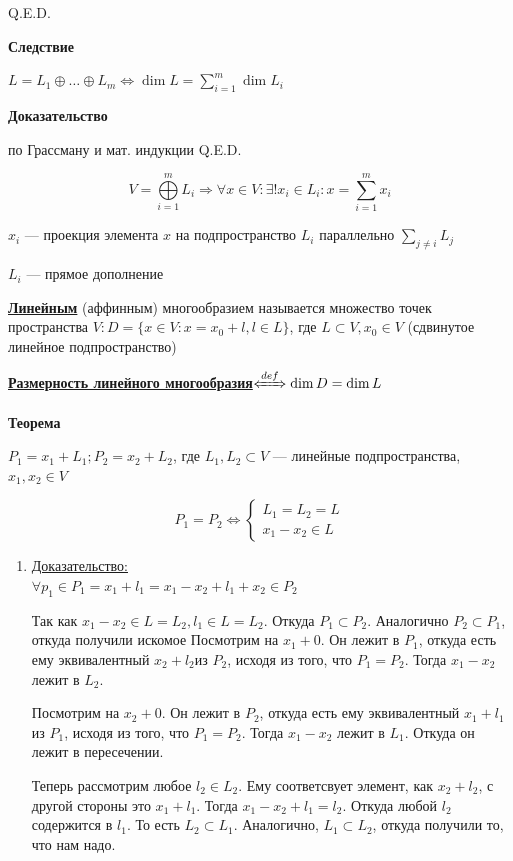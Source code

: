\documentclass[twoside]{book}
\newcommand{\defLeftrightarrow}{\xLeftrightarrow{def}}
\newcommand{\deff}[1]{\underline{\textbf{#1}}}
\newcommand{\prooff}[1]{{\underline{Доказательство:}} \\ }
\begin{document}
\hfill Q.E.D.

\textbf{Следствие}

\(L = L_1 \oplus \ldots \oplus L_m \Leftrightarrow \dim L = \sum\limits_{i = 1}^{m} \dim L_i\)

\textbf{Доказательство}

по Грассману и мат. индукции
\hfill Q.E.D.

\[
    V = \bigoplus\limits_{i = 1}^{m} L_i \Rightarrow \forall x \in V: \exists! x_i \in L_i: x = \sum\limits_{i = 1}^{m} x_i
\]

\(x_i\) --- проекция элемента \(x\) на подпространство \(L_i\) параллельно \(\sum\limits_{j \neq i} L_j\)

\(L_i\) --- прямое дополнение

\deff{Линейным} (аффинным) многообразием называется множество точек пространства \(V: D = \{x \in V: x = x_0 + l, l \in L\}\), где \(L \subset V, x_0 \in V\) (сдвинутое линейное подпространство)

\deff{Размерность линейного многообразия}\(\defLeftrightarrow \dim D = \dim L\)

\textbf{Теорема}

\(P_1 = x_1 + L_1; P_2 = x_2 + L_2\), где \(L_1, L_2 \subset V\) --- линейные подпространства, \(x_1, x_2 \in V\)

\[
    P_1 = P_2 \Leftrightarrow
    \begin{cases*}
        L_1 = L_2 = L \\
        x_1 - x_2 \in L
    \end{cases*}
\]
\begin{enumerate}
    \item[] \prooff{}
          \fbox{\(\Leftarrow\)}
          $\forall p_1 \in P_1 = x_1 + l_1 = x_1-x_2 + l_1 + x_2 \in P_2$

          Так как $x_1-x_2 \in L = L_2, l_1 \in  L = L_2$. Откуда $P_1\subset P_2$. Аналогично $P_2 \subset P_1$, откуда получили искомое
          \fbox{\(\Rightarrow\)}
          Посмотрим на $x_1+0$. Он лежит в $P_1$, откуда есть ему эквивалентный $x_2+l_2$из $P_2$, исходя из того, что $P_1=P_2$. Тогда $x_1-x_2$ лежит в $L_2$.

          Посмотрим на $x_2+0$. Он лежит в $P_2$, откуда есть ему эквивалентный $x_1+l_1$из $P_1$, исходя из того, что $P_1=P_2$. Тогда $x_1-x_2$ лежит в $L_1$. Откуда он лежит в пересечении.

          Теперь рассмотрим любое $l_2 \in L_2$. Ему соответсвует элемент, как $x_2 + l_2$, с другой стороны это $x_1+l_1$. Тогда $x_1-x_2+l_1 = l_2$. Откуда любой $l_2$ содержится в $l_1$. То есть $L_2 \subset L_1$. Аналогично, $L_1 \subset L_2$, откуда получили то, что нам надо.


\end{enumerate}
\end{document}
